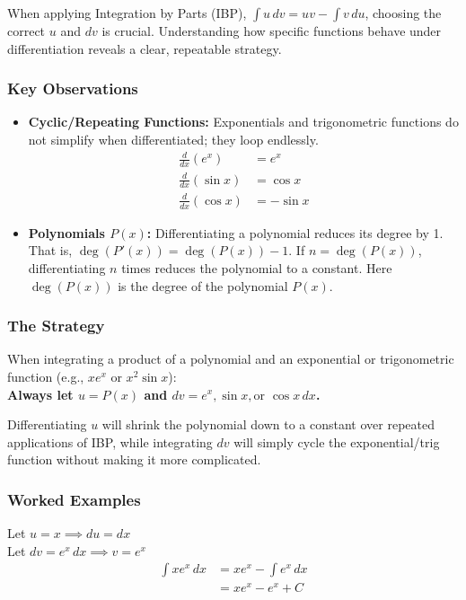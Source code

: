 
When applying Integration by Parts (IBP), $\int u \, dv = uv - \int v \, du$, choosing the correct $u$ and $dv$ is crucial. Understanding how specific functions behave under differentiation reveals a clear, repeatable strategy.

\subsubsection*{Key Observations}

\begin{itemize}[leftmargin=*]
  \item \textbf{Cyclic/Repeating Functions:} Exponentials and trigonometric functions do not simplify when differentiated; they loop endlessly.
  \begin{align*}
    \frac{d}{dx}(e^x) &= e^x \\
    \frac{d}{dx}(\sin x) &= \cos x \\
    \frac{d}{dx}(\cos x) &= -\sin x
  \end{align*}
  \item \textbf{Polynomials $P(x)$:} Differentiating a polynomial reduces its degree by 1. That is, $\deg(P'(x)) = \deg(P(x)) - 1$. If $n = \deg(P(x))$, differentiating $n$ times reduces the polynomial to a constant. Here $\deg(P(x))$ is the degree of the polynomial $P(x)$.
\end{itemize}

\subsubsection*{The Strategy}

When integrating a product of a polynomial and an exponential or trigonometric function (e.g., $x e^x$ or $x^2 \sin x$):\\
\textbf{Always let $u = P(x)$ and $dv = e^x, \sin x, \text{or } \cos x \, dx$.}

Differentiating $u$ will shrink the polynomial down to a constant over repeated applications of IBP, while integrating $dv$ will simply cycle the exponential/trig function without making it more complicated.

\subsubsection*{Worked Examples}

\begin{example}[$\int x e^x \, dx$]
Let $u = x \implies du = dx$ \\
Let $dv = e^x \, dx \implies v = e^x$
\begin{align*}
  \int x e^x \, dx &= x e^x - \int e^x \, dx \\
  &= x e^x - e^x + C
\end{align*}
\end{example}

